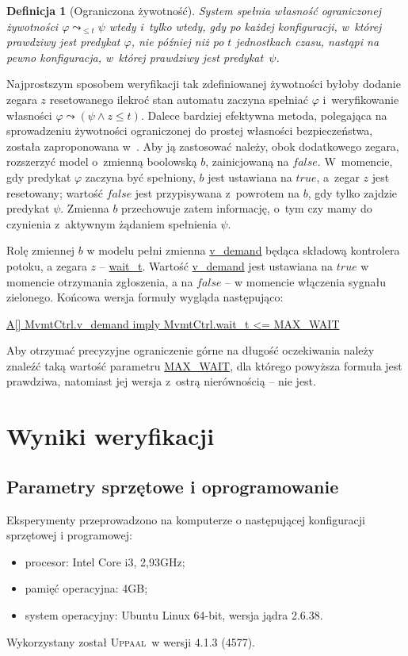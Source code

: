 \documentclass{pracamgr}
\newcommand{\upp}{\textsc{Uppaal}}
\newcommand{\ttt}[1]{\url{#1}}
\newcommand{\tttform}[1]{
  \begin{center}
    \ttt{#1}
  \end{center}
}
\theoremstyle{plain}
\newtheorem{definition}{Definicja}
\begin{document}
\begin{definition}[Ograniczona żywotność]
  System spełnia własność ograniczonej żywotności $\varphi
  \leadsto_{\leq t} \psi $ wtedy i~tylko wtedy, gdy po każdej
  konfiguracji, w~której prawdziwy jest predykat $\varphi$, nie
  później niż po $t$ jednostkach czasu, nastąpi na pewno konfiguracja, w~której
  prawdziwy jest predykat~$\psi$.
\end{definition}
Najprostszym sposobem weryfikacji tak zdefiniowanej żywotności byłoby
dodanie zegara $z$ resetowanego ilekroć stan automatu zaczyna
spełniać $\varphi$ i~weryfikowanie własności \mbox{$\varphi \leadsto
  (\psi \land z\leq t)$}. Dalece bardziej efektywna metoda, polegająca
na sprowadzeniu żywotności ograniczonej do prostej własności
bezpieczeństwa, została zaproponowana w~\cite{lpw:tacas98}. Aby ją
zastosować należy, obok dodatkowego zegara, rozszerzyć model o~zmienną
boolowską $b$, zainicjowaną na $false$.  W~momencie, gdy predykat
$\varphi$ zaczyna być spełniony, $b$ jest ustawiana na $true$, a~zegar
$z$ jest resetowany; wartość $false$ jest przypisywana z~powrotem na
$b$, gdy tylko zajdzie predykat $\psi$. Zmienna $b$ przechowuje zatem
informację, o~tym czy mamy do czynienia z~aktywnym żądaniem spełnienia
$\psi$.

Rolę zmiennej $b$ w modelu pełni zmienna \ttt{v_demand} będąca składową
kontrolera potoku, a zegara $z$ -- \ttt{wait_t}. Wartość \ttt{v_demand}
jest ustawiana na $true$ w momencie otrzymania zgłoszenia, a na
$false$ -- w momencie włączenia sygnału zielonego. Końcowa wersja
formuły wygląda następująco:
\tttform{A[] MvmtCtrl.v_demand imply MvmtCtrl.wait_t <= MAX_WAIT}
Aby otrzymać precyzyjne ograniczenie górne na długość oczekiwania należy
znaleźć taką wartość parametru \ttt{MAX_WAIT}, dla którego powyższa formuła
jest prawdziwa, natomiast jej wersja z~ostrą nierównością -- nie jest.

\section{Wyniki weryfikacji}
\label{s:ver:results}
\subsection{Parametry sprzętowe i oprogramowanie}
Eksperymenty przeprowadzono na komputerze o następującej konfiguracji
sprzętowej i programowej:
\begin{itemize}
  \item procesor: Intel Core i3, 2,93GHz;
  \item pamięć operacyjna: 4GB;
  \item system operacyjny: Ubuntu Linux 64-bit, wersja jądra 2.6.38. 
\end{itemize}
Wykorzystany został \upp\ w wersji 4.1.3 (4577).
\end{document}
